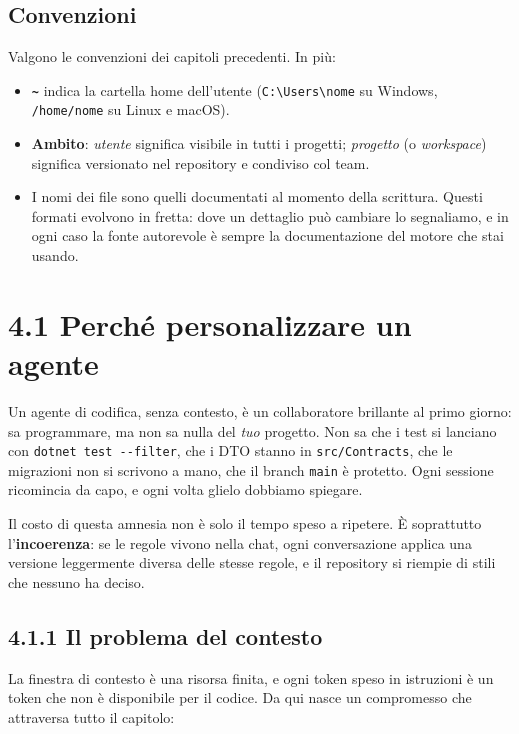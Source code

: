 \documentclass[
  italian,
  10pt,
]{book}
\providecommand{\tightlist}{%
  \setlength{\itemsep}{0pt}\setlength{\parskip}{0pt}}
\begin{document}
\subsection{Convenzioni}\label{convenzioni}

Valgono le convenzioni dei capitoli precedenti. In più:

\begin{itemize}
\tightlist
\item
  \textbf{\texttt{\textasciitilde{}}} indica la cartella home
  dell'utente (\texttt{C:\textbackslash{}Users\textbackslash{}nome} su
  Windows, \texttt{/home/nome} su Linux e macOS).
\item
  \textbf{Ambito}: \emph{utente} significa visibile in tutti i progetti;
  \emph{progetto} (o \emph{workspace}) significa versionato nel
  repository e condiviso col team.
\item
  I nomi dei file sono quelli documentati al momento della scrittura.
  Questi formati evolvono in fretta: dove un dettaglio può cambiare lo
  segnaliamo, e in ogni caso la fonte autorevole è sempre la
  documentazione del motore che stai usando.
\end{itemize}

\section{4.1 Perché personalizzare un
agente}\label{perchuxe9-personalizzare-un-agente}

Un agente di codifica, senza contesto, è un collaboratore brillante al
primo giorno: sa programmare, ma non sa nulla del \emph{tuo} progetto.
Non sa che i test si lanciano con \texttt{dotnet\ test\ -\/-filter}, che
i DTO stanno in \texttt{src/Contracts}, che le migrazioni non si
scrivono a mano, che il branch \texttt{main} è protetto. Ogni sessione
ricomincia da capo, e ogni volta glielo dobbiamo spiegare.

Il costo di questa amnesia non è solo il tempo speso a ripetere. È
soprattutto l'\textbf{incoerenza}: se le regole vivono nella chat, ogni
conversazione applica una versione leggermente diversa delle stesse
regole, e il repository si riempie di stili che nessuno ha deciso.

\subsection{4.1.1 Il problema del
contesto}\label{il-problema-del-contesto}

La finestra di contesto è una risorsa finita, e ogni token speso in
istruzioni è un token che non è disponibile per il codice. Da qui nasce
un compromesso che attraversa tutto il capitolo:
\end{document}
